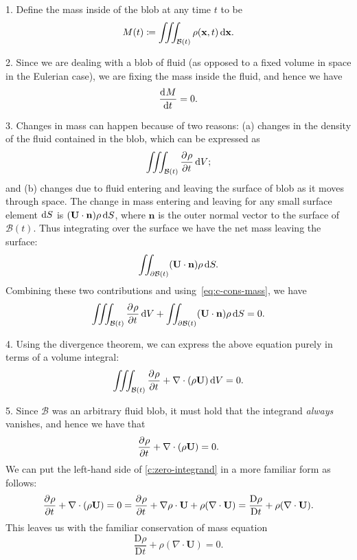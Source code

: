 \documentclass{article}
\def\*#1{\mathbf{#1}}
\newcommand{\B}{\mathcal{B}}
\newcommand{\dadvd}[2]{\dfrac{\text{D} #1}{\text{D} #2}} %
\begin{document}
1. Define the mass inside of the blob at any time $t$ to be
%
\begin{equation*}
    M(t) \coloneqq \iiint_{\B(t)} \rho(\*x, t) \dif \*x
    .
\end{equation*}

2. Since we are dealing with a blob of fluid (as opposed to a fixed volume
in space in the Eulerian case), we are fixing the mass inside the fluid,
and hence we have
%
\begin{equation}
    \dod{M}{t} = 0
    .
    \label{eq:c-cons-mass}
\end{equation}

3. Changes in mass can happen because of two reasons: (a) changes in the
density of the fluid contained in the blob, which can be expressed as
%
\begin{equation*}
    \iiint_{\B(t)} \dpd{\rho}{t} \dif V
    ;
\end{equation*}
%
and (b) changes due to fluid entering and leaving the surface of blob as
it moves through space. The change in mass entering and leaving for any
small surface element $\dif S$ is $(\*U \cdot \*n) \rho \dif S$, where
$\*n$ is the outer normal vector to the surface of $\B(t)$. Thus
integrating over the surface we have the net mass leaving the surface:
%
\begin{equation*}
    \iint_{\partial \B(t)} (\*U \cdot \*n) \rho \dif S
    .
\end{equation*}
%
Combining these two contributions and using~\eqref{eq:c-cons-mass}, we have
%
\begin{equation*}
    \iiint_{\B(t)} \dpd{\rho}{t} \dif V
    +
    \iint_{\partial \B(t)} (\*U \cdot \*n) \rho \dif S
    = 0
    .
\end{equation*}

4. Using the divergence theorem, we can express the above equation purely
in terms of a volume integral:
%
\begin{equation*}
    \iiint_{\B(t)}
        \dpd{\rho}{t}
        +
        \nabla \cdot (\rho \*U)
    \dif V
    = 0
    .
\end{equation*}

5. Since $\B$ was an arbitrary fluid blob, it must hold that the integrand
\textit{always} vanishes, and hence we have that
%
\begin{equation}
    \dpd{\rho}{t}
    +
    \nabla \cdot (\rho \*U)
    = 0
    .
    \label{c:zero-integrand}
\end{equation}
%
We can put the left-hand side of \eqref{c:zero-integrand} in a more
familiar form as follows:
%
\begin{align*}
    \dpd{\rho}{t} + \nabla \cdot (\rho \*U) = 0
        = \dpd{\rho}{t} + \nabla \rho \cdot \*U + \rho (\nabla \cdot \*U)
        = \dadvd{\rho}{t} + \rho (\nabla \cdot \*U)
    .
\end{align*}
%
This leaves us with the familiar conservation of mass equation
%
\begin{equation*}
    \dadvd{\rho}{t} + \rho (\nabla \cdot \*U) = 0
    .
\end{equation*}
\end{document}
